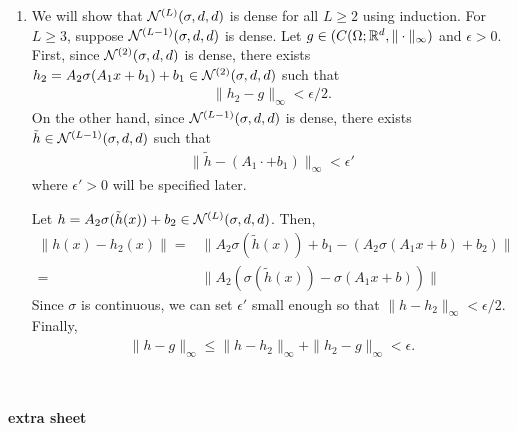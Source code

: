 \documentclass[12pt]{article}
\begin{document}
\begin{enumerate}
\begin{solution}
\begin{enumerate}
    \item We will show that ${\mathcal{N}}^{(L)}(\sigma, d, d)$ is dense for all $L\geq 2$ using induction.
    For $L\geq 3$, suppose ${\mathcal{N}}^{(L-1)}(\sigma, d, d)$ is dense.
    Let $g\in (C(\Omega; {\mathbb{R}}^d, \|\cdot\|_\infty)$ and $\epsilon> 0$.
    First, since ${\mathcal{N}}^{(2)}(\sigma, d, d)$ is dense, there exists $h_2=A_2\sigma(A_1x+b_1)+b_1\in{\mathcal{N}}^{(2)}(\sigma, d, d)$ such that
    \begin{align*}
        \|h_2-g\|_\infty < \epsilon/2.
    \end{align*}
    On the other hand, since ${\mathcal{N}}^{(L-1)}(\sigma, d, d)$ is dense, there exists $\tilde{h}\in{\mathcal{N}}^{(L-1)}(\sigma, d, d)$ such that
    \begin{align}
        \|\tilde{h} - (A_1\cdot +b_1)\|_\infty < \epsilon'
    \end{align}
    where $\epsilon'>0$ will be specified later.

    Let $h=A_2\sigma(\tilde{h}(x))+b_2\in{\mathcal{N}}^{(L)}(\sigma, d, d)$.
    Then,
    \begin{align*}
        \|h(x) - h_2(x)\| =& \|A_2\sigma(\tilde{h}(x)) + b_1 - (A_2\sigma(A_1x+b)+b_2)\|\\
        =& \|A_2(\sigma(\tilde{h}(x)) -\sigma(A_1x+b))\|
    \end{align*}
    Since $\sigma$ is continuous, we can set $\epsilon'$ small enough so that $\|h - h_2\|_\infty < \epsilon/2$.
    Finally,
    \begin{align}
        \|h-g\|_\infty \leq \|h-h_2\|_\infty + \|h_2-g\|_\infty < \epsilon.
    \end{align}
    
    
\end{enumerate}
\end{solution}
 
\end{enumerate}

\begin{problem}
   ~~\clearpage
   
     {\bf extra sheet}
\end{problem}
\end{document}

